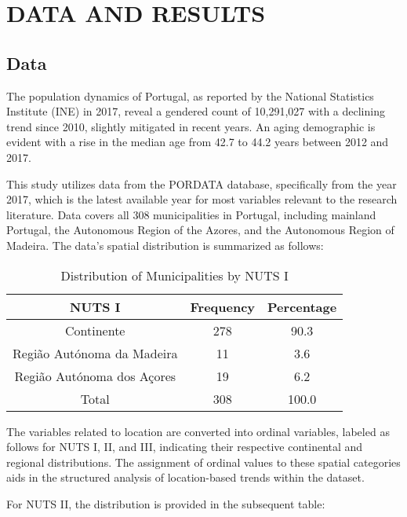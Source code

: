 \documentclass{aip-cp}
\begin{document}
\section{\uppercase{Data and Results}}
\subsection{Data}
The population dynamics of Portugal, as reported by the National Statistics Institute (INE) in 2017, reveal a gendered count of 10,291,027 with a declining trend since 2010, slightly mitigated in recent years. An aging demographic is evident with a rise in the median age from 42.7 to 44.2 years between 2012 and 2017. 

This study utilizes data from the PORDATA database, specifically from the year 2017, which is the latest available year for most variables relevant to the research literature. Data covers all 308 municipalities in Portugal, including mainland Portugal, the Autonomous Region of the Azores, and the Autonomous Region of Madeira. The data's spatial distribution is summarized as follows:

\begin{table}[h!]
\centering
\begin{tabular}{ccc}
\toprule
NUTS I & Frequency & Percentage \\ 
\midrule
Continente & 278 & 90.3 \\
Região Autónoma da Madeira & 11 & 3.6 \\
Região Autónoma dos Açores & 19 & 6.2 \\
Total & 308 & 100.0 \\ 
\bottomrule
\end{tabular}
\caption{Distribution of Municipalities by NUTS I}
\label{tab:my_label}
\end{table}

The variables related to location are converted into ordinal variables, labeled as follows for NUTS I, II, and III, indicating their respective continental and regional distributions. The assignment of ordinal values to these spatial categories aids in the structured analysis of location-based trends within the dataset.

For NUTS II, the distribution is provided in the subsequent table:
\end{document}
